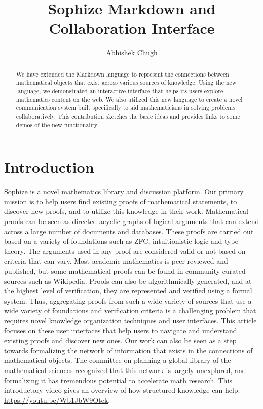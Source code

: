 \documentclass[a4paper]{article}
\title{Sophize Markdown and Collaboration Interface }
\author{
Abhishek Chugh
}
\begin{document}
\maketitle

\begin{abstract}
We have extended the Markdown language to represent the connections between mathematical objects that exist across various sources of knowledge. Using the new language, we demonstrated an interactive interface that helps its users explore mathematics content on the web. We also utilized this new language to create a novel communication system built specifically to aid mathematicians in solving problems collaboratively. This contribution sketches the basic ideas and provides links to some demos of the new functionality.

\end{abstract}

\vskip 32pt

 

\section{Introduction}


Sophize is a novel mathematics library and discussion platform. Our primary mission is to help users find existing proofs of mathematical statements, to discover new proofs, and to utilize this knowledge in their work. Mathematical proofs can be seen as directed acyclic graphs of logical arguments that can extend across a large number of documents and databases. These proofs are carried out based on a variety of foundations such as ZFC, intuitionistic logic and type theory. The arguments used in any proof are considered valid  or not based on criteria that can vary. Most academic mathematics is peer-reviewed and published, but some mathematical proofs can be found in community curated sources such as Wikipedia. Proofs can also be algorithmically generated, and at the highest level of verification, they are represented and verified using a formal system. Thus, aggregating proofs from such a wide variety of sources that use a wide variety of foundations and verification criteria is a challenging problem that requires novel knowledge organization techniques and user interfaces. This article focuses on these user interfaces that help users to navigate and understand existing proofs and discover new ones.  Our work can also be seen as a step towards formalizing the network of information that exists in the connections of mathematical objects. The committee on planning a global library of the mathematical sciences recognized that this network is largely unexplored, and formalizing it has tremendous potential to accelerate math research\cite{sciences2014developing}. This introductory video gives an overview of how structured knowledge can help: \url{https://youtu.be/Wb1JbW9Otek}.
\end{document}
